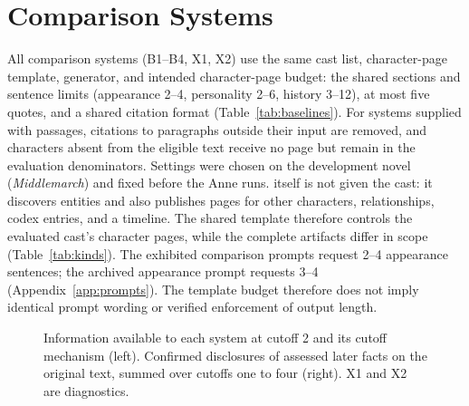 \section{Comparison Systems}
\label{app:baselines}

All comparison systems (B1--B4, X1, X2) use the same cast list, character-page template,
generator, and intended character-page budget:
the shared sections and sentence limits (appearance 2--4, personality 2--6, history 3--12), at most five
quotes, and a shared citation format (Table~\ref{tab:baselines}). For systems supplied with
passages, citations to paragraphs outside their input are removed, and characters absent
from the eligible text receive no page but remain in the evaluation denominators. Settings were chosen on the development novel
(\emph{Middlemarch}) and fixed before the Anne runs. \sys itself is not given the cast: it
discovers entities and also publishes pages for other characters, relationships,
codex entries, and a timeline. The shared template therefore controls the evaluated cast's
character pages, while the complete artifacts differ in scope (Table~\ref{tab:kinds}).
The exhibited comparison prompts request 2--4 appearance sentences; the archived \sys
appearance prompt requests 3--4 (Appendix~\ref{app:prompts}). The template budget therefore
does not imply identical prompt wording or verified enforcement of output length.

\begin{figure}[t]
\centering

\caption{Information available to each system at cutoff 2 and its cutoff mechanism (left).
Confirmed disclosures of assessed later facts on the original text, summed over cutoffs
one to four (right). X1 and X2 are diagnostics.}
\label{fig:systems}
\end{figure}

